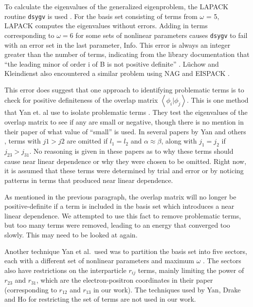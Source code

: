 \documentclass[Dissertation.tex]{subfiles}
\begin{document}
To calculate the eigenvalues of the generalized eigenproblem, the LAPACK routine \texttt{dsygv} is used \cite{dsygv}. For the basis set consisting of terms from $\omega$ = 5, LAPACK computes the eigenvalues without errors. Adding in terms corresponding to $\omega = 6$ for some sets of nonlinear parameters causes \texttt{dsygv} to fail with an error set in the last parameter, Info. This error is always an integer greater than the number of terms, indicating from the library documentation that ``the leading minor of order i of B is not positive definite'' \cite{dsygv}. L\"uchow and Kleindienst also encountered a similar problem using NAG and EISPACK \cite{Luchow1993}.

This error does suggest that one approach to identifying problematic terms is to check for positive definiteness of the overlap matrix $\left\langle \phi_i | \phi_j \right\rangle$. This is one method that Yan et. al use to isolate problematic terms \cite{Yan1999}. They test the eigenvalues of the overlap matrix to see if any are small or negative, though there is no mention in their paper of what value of ``small'' is used. In several papers by Yan and others \cite{Yan1998,Yan1998a,Yan1999,Drake1995,Yan1997a}, terms with $j1 > j2$ are omitted if $l_1 = l_2$ and $\alpha \approx \beta$, along with $j_1 = j_2$ if $j_{23} > j_{31}$. No reasoning is given in these papers as to why these terms should cause near linear dependence or why they were chosen to be omitted. Right now, it is assumed that these terms were determined by trial and error or by noticing patterns in terms that produced near linear dependence.

As mentioned in the previous paragraph, the overlap matrix will no longer be positive-definite if a term is included in the basis set which introduces a near linear dependence. We attempted to use this fact to remove problematic terms, but too many terms were removed, leading to an energy that converged too slowly. This may need to be looked at again.

Another technique Yan et al.\ used was to partition the basis set into five sectors, each with a different set of nonlinear parameters and maximum $\omega$ \cite{Yan1999}. The sectors also have restrictions on the interparticle $r_{ij}$ terms, mainly limiting the power of $r_{23}$ and $r_{31}$, which are the electron-positron coordinates in their paper (corresponding to $r_{12}$ and $r_{13}$ in our work). The techniques used by Yan, Drake and Ho for restricting the set of terms are not used in our work.
\end{document}
